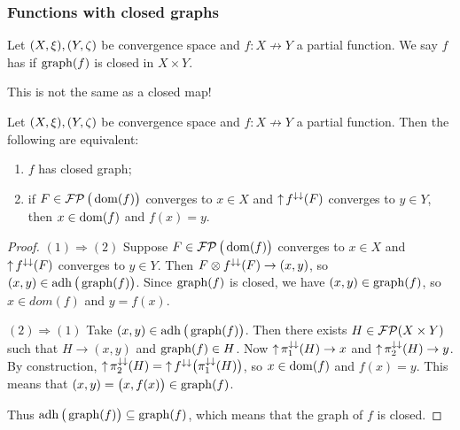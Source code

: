 \subsubsection{Functions with closed graphs}
\begin{definition}
Let $\sSet{X,\xi}, \sSet{Y,\zeta}$ be convergence space and $f: X\not\to Y$ a partial function. We say $f$ has  if $\operatorname{graph}(f)$ is closed in $X\times Y$.
\end{definition}
This is not the same as a closed map!

\label{secFunctionsClosedGraph}

\begin{proposition} \label{closedGraphEquivalence}
Let $\sSet{X,\xi}, \sSet{Y,\zeta}$ be convergence space and $f: X\not\to Y$ a partial function. Then
the following are equivalent:
\begin{enumerate}
\item $f$ has closed graph;
\item if $F\in \operatorname{\mathcal{FP}}\big(\operatorname{dom}(f)\big)$ converges to $x\in X$ and $\operatorname{\uparrow} f^{\downarrow\downarrow}(F)$ converges to $y\in Y$, then $x\in\operatorname{dom}(f)$ and $f(x) = y$.
\end{enumerate}
\end{proposition}
\begin{proof}
$(1) \Rightarrow (2)$ Suppose $F\in \operatorname{\mathcal{FP}}\big(\operatorname{dom}(f)\big)$ converges to $x\in X$ and $\operatorname{\uparrow} f^{\downarrow\downarrow}(F)$ converges to $y\in Y$. Then $F\otimes f^{\downarrow\downarrow}(F) \to (x, y)$, so $(x, y) \in \operatorname{adh}\big(\operatorname{graph}(f)\big)$. Since $\operatorname{graph}(f)$ is closed, we have $(x, y) \in \operatorname{graph}(f)$, so $x\in dom(f)$ and $y= f(x)$.

$(2) \Rightarrow (1)$ Take $(x, y) \in \operatorname{adh}\big(\operatorname{graph}(f)\big)$. Then there exists $H\in \operatorname{\mathcal{FP}}(X\times Y)$ such that $H\to (x,y)$ and $\operatorname{graph}(f)\in H$. Now $\operatorname{\uparrow}\pi_1^{\downarrow\downarrow}(H) \to x$ and $\operatorname{\uparrow}\pi_2^{\downarrow\downarrow}(H) \to y$. By construction, $\operatorname{\uparrow}\pi_2^{\downarrow\downarrow}(H) = \operatorname{\uparrow} f^{\downarrow\downarrow}\big(\pi_1^{\downarrow\downarrow}(H)\big)$, so $x\in \operatorname{dom}(f)$ and $f(x) = y$. This means that $(x,y) = \big(x,f(x)\big) \in \operatorname{graph}(f)$.

Thus $\operatorname{adh}\big(\operatorname{graph}(f)\big) \subseteq \operatorname{graph}(f)$, which means that the graph of $f$ is closed.
\end{proof}

